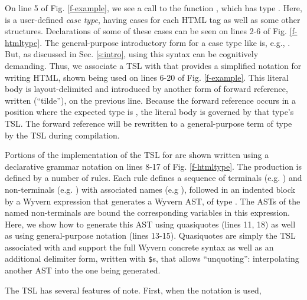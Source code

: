 On line 5 of Fig. \ref{f-example}, we see a call to the function , which has type . Here,  is a user-defined \emph{case type}, having cases for each HTML tag as well as some other structures. Declarations  of some of these cases can be seen on lines 2-6 of Fig. \ref{f-htmltype}. The general-purpose introductory form for a case type like  is, e.g., . But, as discussed in Sec. \ref{s:intro}, using this syntax can be cognitively demanding. Thus, we associate a TSL with  that provides a simplified notation for writing HTML, shown being used on lines 6-20 of Fig. \ref{f-example}. This literal body is layout-delimited and introduced by another form of forward reference, written \li{~} (``tilde''), on the previous line. Because the forward reference occurs in a position where the expected type is , the literal body is governed by that type's TSL. The forward reference will be rewritten to a general-purpose term of type  by the TSL during compilation.

Portions of the implementation of the TSL for  are shown written using a declarative grammar notation on lines 8-17 of Fig. \ref{f-htmltype}. The  production is defined by a number of rules. Each rule defines a sequence of terminals (e.g. ) and non-terminals (e.g. ) with associated names (e.g ), followed in an indented block by a Wyvern expression that generates a Wyvern AST, of type . The ASTs of the named non-terminals are bound the corresponding variables in this expression. Here, we show how to generate this AST using quasiquotes (lines 11, 18) as well as using general-purpose notation (lines 13-15). Quasiquotes are simply the TSL associated with  and support the full Wyvern concrete syntax as well as an additional delimiter form, written with \verb|$|s, that allows ``unquoting'': interpolating another AST into the one being generated.

The  TSL has several features of note. First, when the  notation is used, 



